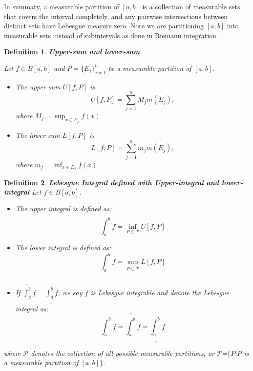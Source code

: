 \documentclass[12pt]{amsart}
\newtheorem{definition}{Definition}
\theoremstyle{plain}
\theoremstyle{definition}
\theoremstyle{remark}
\numberwithin{equation}{section}
\numberwithin{thm}{section}
\begin{document}
In summary, a measurable partition of $[a, b]$ is a collection of measurable sets that covers the interval completely, and any pairwise intersections between distinct sets have Lebesgue measure zero. Note we are partitioning $[a,b]$ into measurable sets instead of subintervals as done in Riemann integration.

\begin{definition}
\textbf{Upper-sum and lower-sum }    

Let $f \in B[a,b]$ and $P=\{ E_j \}_{j=1}^n$ be a measurable partition of $[a,b]$. 

\begin{itemize}
    \item [(i)] The upper sum $U[f,P]$ is
    \begin{equation*}
        U[f,P]=\sum_{j=1}^n M_j m(E_j),
    \end{equation*}
    where $M_j=\sup_{x \in E_j} f(x)$
    \item [(i)] The lower sum $L[f,P]$ is
    \begin{equation*}
        L[f,P]=\sum_{j=1}^n m_j m(E_j),
    \end{equation*}
    where $m_j=\inf_{x \in E_j} f(x)$
\end{itemize}
\end{definition}

\begin{definition}
\textbf{Lebesgue Integral defined with Upper-integral and lower-integral}    
Let $f \in B[a,b]$.
\begin{itemize}
    \item [(i)] The upper integral is defined as:
    \begin{equation*}
        \overline{\int _{a}^{b}}f = \inf_{P \in \mathcal{P}} U[f,P] 
    \end{equation*}
    \item [(ii)] The lower integral is defined as:
    \begin{equation*}
        \underline{\int_{a}^{b}}f = \sup_{P \in \mathcal{P}} L[f,P] 
    \end{equation*}
     \item [(iii)] If $\overline{\int_{a}^{b}}f = \underline{\int_{a}^{b}}f$, we say $f$ is Lebesgue integrable and denote the Lebesgue integral as:
     \begin{equation*}
         \int_{a}^{b}f = \overline{\int_{a}^{b}}f = \underline{\int_{a}^{b}}f
     \end{equation*}    
\end{itemize}
where $\mathcal{P}$ denotes the collection of all possible measurable partitions, or $\mathcal{P}$=$\{P| P$ is a measurable partition of $[a,b]\}$.
\end{definition}
\end{document}
